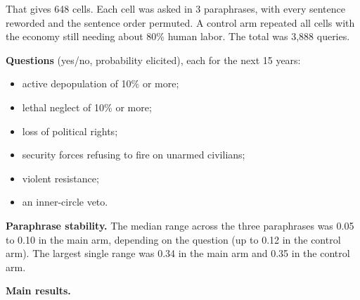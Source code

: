 \documentclass[
  10pt,
]{article}
\providecommand{\tightlist}{%
  \setlength{\itemsep}{0pt}\setlength{\parskip}{0pt}}
\begin{document}
That gives 648 cells. Each cell was asked in 3 paraphrases, with every sentence reworded and the
sentence order permuted. A control arm repeated all cells with the economy still needing about 80\%
human labor. The total was 3,888 queries.

\textbf{Questions} (yes/no, probability elicited), each for the next 15 years:

\begin{itemize}
\tightlist
\item
  active depopulation of 10\% or more;
\item
  lethal neglect of 10\% or more;
\item
  loss of political rights;
\item
  security forces refusing to fire on unarmed civilians;
\item
  violent resistance;
\item
  an inner-circle veto.
\end{itemize}

\textbf{Paraphrase stability.} The median range across the three paraphrases was 0.05 to 0.10 in the
main arm, depending on the question (up to 0.12 in the control arm). The largest single range was
0.34 in the main arm and 0.35 in the control arm.

\textbf{Main results.}
\end{document}
